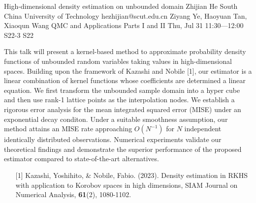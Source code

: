 \begin{talk}
  {High-dimensional density estimation on  unbounded domain}%
  {Zhijian He}%
  {South China University of Technology}%
  {hezhijian@scut.edu.cn}%
  {Ziyang Ye, Haoyuan Tan, Xiaoqun Wang}%
  {QMC and Applications Parts I and II}%
  {Thu, Jul 31 11:30---12:00}%
  {S22-3}%
  {S22}%
    
   
This talk will present a kernel-based method to approximate probability density functions of unbounded random variables taking values in high-dimensional spaces. Building upon the framework of Kazashi and Nobile [1], our estimator is a linear combination of kernel functions whose coefficients are determined a linear equation. We first transform the unbounded sample domain into a hyper cube and then use rank-1 lattice points as the interpolation nodes.
We establish a rigorous error analysis for the mean integrated squared error (MISE) under an exponential decay conditon.  Under a suitable smoothness assumption, our method attains an MISE rate  approaching $O(N^{-1})$ for $N$ independent identically distributed observations. Numerical experiments validate our theoretical findings and demonstrate the superior performance of the proposed estimator compared to state-of-the-art alternatives.
\medskip


\begin{enumerate}
 \item[{[1]}] Kazashi, Yoshihito, \& Nobile, Fabio. (2023). Density estimation in {RKHS} with application to Korobov spaces in high dimensions, SIAM Journal on Numerical Analysis, \textbf{61}(2), 1080-1102.
\end{enumerate}

\end{talk}

